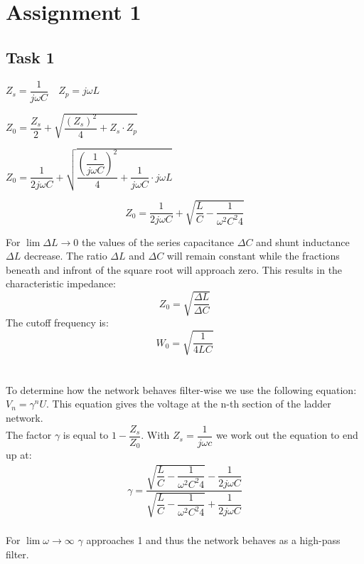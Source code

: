 \documentclass[final]{scrreprt} %
\begin{document}
\chapter*{Assignment 1}
\label{ch:sk5-ass1-task1}
\section*{Task 1}
\begin{center}
$Z_s = \dfrac{1}{j \omega C}$\,\,\,\, $Z_p = j \omega L$

$Z_0 = \dfrac{Z_s}{2} + \sqrt{\dfrac{(Z_s)^2}{4} + Z_s \cdot Z_p}$

$Z_0 = \dfrac{1}{2j \omega C} + \sqrt{\dfrac{(\dfrac{1}{j \omega C})^2}{4} + \dfrac{1}{j \omega C} \cdot j \omega L}$

\begin{equation}
Z_0 = \dfrac{1}{2j \omega C} + \sqrt{\dfrac{L}{C} - \dfrac{1}{\omega^2 C^2 4}}
\end{equation}
\end{center}
For $\lim{\Delta  L\to 0}$ the values of the series capacitance $\Delta C$ and shunt inductance $\Delta L$ decrease. The ratio $\Delta L$ and $\Delta C$ will remain constant while the fractions beneath and infront of the square root will approach zero. 
This results in the characteristic impedance:
\begin{equation}
Z_0 = \sqrt{\dfrac{\Delta L}{\Delta C}}
\end{equation}
The cutoff frequency is:
\begin{equation}
W_0 = \sqrt{\dfrac{1}{4LC}}
\end{equation}\\
\\
To determine how the network behaves filter-wise we use the following equation: $V_n = \gamma^n U$. 
This equation gives the voltage at the n-th section of the ladder network.\\
The factor $\gamma$ is equal to $1 - \dfrac{Z_s}{Z_0}$.
With $Z_s = \dfrac{1}{j \omega c}$ we work out the equation to end up at:
\begin{align}
\gamma = \dfrac{\sqrt{\dfrac{L}{C} - \dfrac{1}{\omega^2 C^2 4}} - \dfrac{1}{2j \omega C}}{\sqrt{\dfrac{L}{C} - \dfrac{1}{\omega^2 C^2 4}} + \dfrac{1}{2j \omega C}}
\end{align}
\\For $\lim{\omega \to \infty}$ $\gamma$ approaches 1 and thus the network behaves as a high-pass filter.

\label{ch:sk5-ass1-task2}
\end{document}
